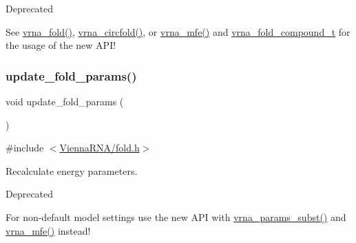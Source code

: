 \begin{DoxyRefDesc}{Deprecated}
\item[\mbox{\hyperlink{deprecated__deprecated000073}{Deprecated}}]See \mbox{\hyperlink{group__mfe__fold__single_ga29a33b2895f4e67b0480271ff289afdc}{vrna\+\_\+fold()}}, \mbox{\hyperlink{group__mfe__fold__single_gaf973483d8acbc8cc9aacfc8a9b7f0074}{vrna\+\_\+circfold()}}, or \mbox{\hyperlink{group__mfe__fold_gabd3b147371ccf25c577f88bbbaf159fd}{vrna\+\_\+mfe()}} and \mbox{\hyperlink{group__fold__compound_ga1b0cef17fd40466cef5968eaeeff6166}{vrna\+\_\+fold\+\_\+compound\+\_\+t}} for the usage of the new A\+P\+I!\end{DoxyRefDesc}
\mbox{\label{group__mfe__fold__single_ga41bf8f6fa15b94471f7095cad9f0ccf3}} 
\subsubsection{\texorpdfstring{update\+\_\+fold\+\_\+params()}{update\_fold\_params()}}
{\footnotesize\ttfamily void update\+\_\+fold\+\_\+params (\begin{DoxyParamCaption}\item[{void}]{ }\end{DoxyParamCaption})}



{\ttfamily \#include $<$\mbox{\hyperlink{fold_8h}{Vienna\+R\+N\+A/fold.\+h}}$>$}



Recalculate energy parameters. 

\begin{DoxyRefDesc}{Deprecated}
\item[\mbox{\hyperlink{deprecated__deprecated000074}{Deprecated}}]For non-\/default model settings use the new A\+PI with \mbox{\hyperlink{group__energy__parameters_ga5d1909208f7ea3baa98b75afaa1f62ca}{vrna\+\_\+params\+\_\+subst()}} and \mbox{\hyperlink{group__mfe__fold_gabd3b147371ccf25c577f88bbbaf159fd}{vrna\+\_\+mfe()}} instead!\end{DoxyRefDesc}
\mbox{\label{group__mfe__fold__single_gae66dc422efb8f5d56717d92d6002a9f8}} 
